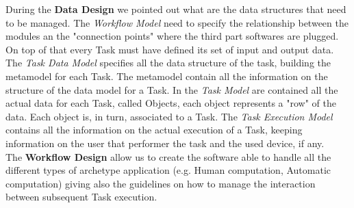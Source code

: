 During the \textbf{Data Design} we pointed out what are the data structures that
need to be managed. The \emph{Workflow Model} need to specify the relationship
between the modules an the "connection points" where the third part softwares
are plugged. On top of that every Task must have defined its set of input and
output data.
The \emph{Task Data Model} specifies all the data structure of the task, building
the metamodel for each Task. The metamodel contain all the information on the 
structure of the data model for a Task.
In the \emph{Task Model} are contained all the actual data for each Task, called
Objects, each object represents a "row" of the data. Each object is, in turn,
associated to a Task.
The \emph{Task Execution Model} contains all the information on the actual
execution of a Task, keeping information on the user that performer the task and
the used device, if any.\\

The \textbf{Workflow Design} allow us to create the software able to handle all
the different types of archetype application (e.g. Human computation, Automatic
computation) giving also the guidelines on how to manage the interaction between
subsequent Task execution.